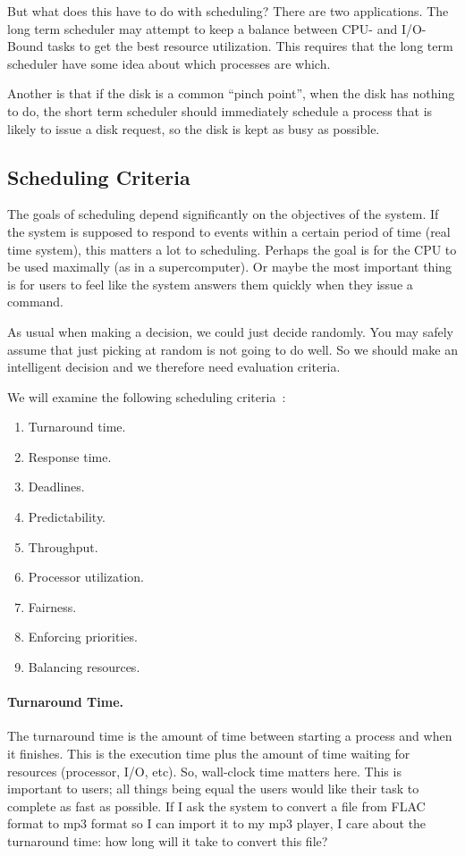 But what does this have to do with scheduling? There are two applications. The long term scheduler may attempt to keep a balance between CPU- and I/O-Bound tasks to get the best resource utilization. This requires that the long term scheduler have some idea about which processes are which.

Another is that if the disk is a common ``pinch point'', when the disk has nothing to do, the short term scheduler should immediately schedule a process that is likely to issue a disk request, so the disk is kept as busy as possible.

\subsection*{Scheduling Criteria}

The goals of scheduling depend significantly on the objectives of the system. If the system is supposed to respond to events within a certain period of time (real time system), this matters a lot to scheduling. Perhaps the goal is for the CPU to be used maximally (as in a supercomputer). Or maybe the most important thing is for users to feel like the system answers them quickly when they issue a command.

As usual when making a decision, we could just decide randomly. You may safely assume that just picking at random is not going to do well. So we should make an intelligent decision and  we therefore need evaluation criteria.

We will examine the following scheduling criteria~\cite{osi}:

\begin{enumerate}
	\item Turnaround time.
	\item Response time.
	\item Deadlines.
	\item Predictability.
	\item Throughput.
	\item Processor utilization.
	\item Fairness.
	\item Enforcing priorities.
	\item Balancing resources.
\end{enumerate}

\paragraph{Turnaround Time.} The turnaround time is the amount of time between starting a process and when it finishes. This is the execution time plus the amount of time waiting for resources (processor, I/O, etc). So, wall-clock time matters here. This is important to users; all things being equal the users would like their task to complete as fast as possible. If I ask the system to convert a file from FLAC format to mp3 format so I can import it to my mp3 player, I care about the turnaround time: how long will it take to convert this file?

